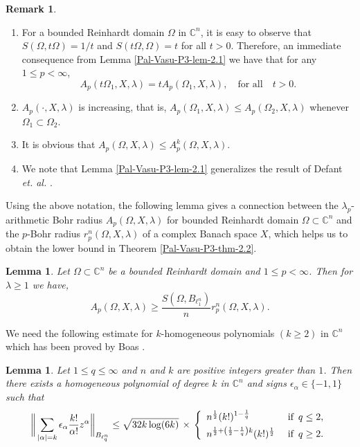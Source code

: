 \documentclass[a4paper,12pt]{amsart}
\newtheorem{lem}[equation]{Lemma}
\theoremstyle{definition}
\newtheorem{rem}{Remark}[section]
\begin{document}
\begin{rem}
	\begin{enumerate}
		\item[(a)] For a bounded Reinhardt domain $\Omega$ in $\mathbb{C}^n$, it is easy to observe that $S(\Omega, t\Omega)=1/t$ and $S(t\Omega, \Omega)=t$  for all $t>0.$ Therefore, an immediate consequence from Lemma \ref{Pal-Vasu-P3-lem-2.1} we have that for any $1\leq p<\infty$,
		\begin{equation*}
			A_p(t\Omega_{1}, X, \lambda)=tA_p(\Omega_{1}, X, \lambda),\quad \mbox{for all}\quad t>0.
 		\end{equation*}
 	\item[(b)]$A_p(\cdot,X, \lambda)$ is increasing, that is, $A_p(\Omega_{1}, X,  \lambda)\leq A_p(\Omega_{2},X, \lambda)$ whenever $\Omega_{1} \subset \Omega_{2}.$
 	
 	\item[(c)] It is obvious that $A_p(\Omega,X,\lambda)\leq A^k_p(\Omega,X,\lambda)$.
 	\item[(d)] We note that Lemma \ref{Pal-Vasu-P3-lem-2.1} generalizes the result of Defant {\it et. al.} \cite[Lemma 4.2]{defant-2007}.
	\end{enumerate}
	
\end{rem}


Using the above notation, the following lemma gives a connection between the $\lambda_p$-arithmetic Bohr radius $A_p(\Omega, X, \lambda)$ for bounded Reinhardt domain $\Omega\subset \mathbb{C}^n$ and the $p$-Bohr radius $r^n_p(\Omega,X,\lambda)$ of a complex Banach space $X$, which helps us to obtain the lower bound in Theorem \ref{Pal-Vasu-P3-thm-2.2}.
\begin{lem}\label{Pal-Vasu-P3-lem-2.2}
	Let $\Omega \subset\mathbb{C}^n$ be a bounded Reinhardt domain and $1\leq p<\infty$. Then for $\lambda \geq 1$ we have,
	\begin{equation*}
		A_p(\Omega,X, \lambda) \geq \frac{S(\Omega, B_{\ell^n_1})}{n}r^n_p(\Omega,X,\lambda).
	\end{equation*}
\end{lem}


We need the following estimate for $k$-homogeneous polynomials $(k\geq 2)$ in $\mathbb{C}^n$ which has been proved by Boas \cite{boas-2000}.

\begin{lem}\cite{boas-2000}\label{P3-boas-lem-2.3}
	Let $1\leq q \leq \infty$ and $n$ and $k$ are positive integers greater than $1$. Then there exists a homogeneous polynomial of degree $k$ in $\mathbb{C}^n$ and signs $\epsilon_{\alpha}\in \{-1, 1\}$ such that 
	\begin{equation*}
		\bigg\|\sum_{|\alpha|=k}\epsilon_{\alpha}\frac{k!}{\alpha!}z^{\alpha}\bigg\|_{B_{\ell^n_q}}\leq \sqrt{32k\log (6k)}\,\times\, \left\{\begin{array}{ll}
			n^{\frac{1}{2}}(k!)^{1-\frac{1}{q}}  & \mbox{ if  \,$q\leq 2$},\\[1mm]
			n^{\frac{1}{2}+\left(\frac{1}{2}-\frac{1}{q}\right)k}(k!)^{\frac{1}{2}}  & \mbox{ if \,$q\geq 2$}.
		\end{array}\right.
	\end{equation*}
\end{lem}
\end{document}
